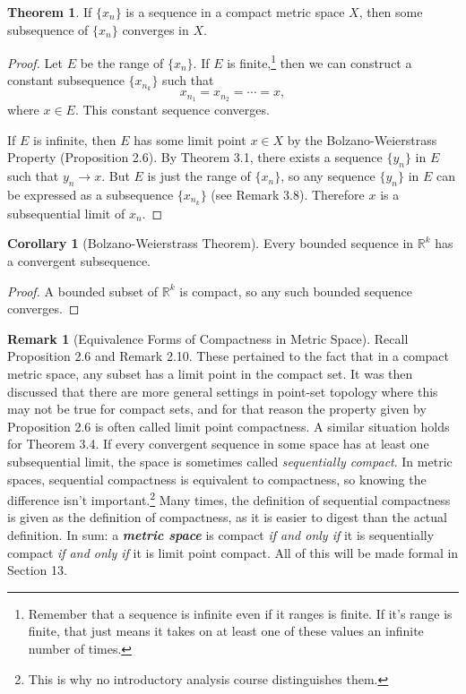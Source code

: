 \documentclass{article}
\newcommand{\R}{\mathbb{R}}
\theoremstyle{definition}
\newtheorem{theorem}{Theorem}[section]
\newtheorem{corollary}{Corollary}[section]
\newtheorem{remark}{Remark}[section]
\begin{document}
	\begin{theorem}
		If $ \{x_n\} $ is a sequence in a compact metric space $ X $, then some subsequence of $ \{x_n\} $ converges in $ X $. 
	\end{theorem}
	\begin{proof}
		Let $ E $ be the range of $ \{x_n\} $. If $ E $ is finite,\footnote{Remember that a sequence is infinite even if it ranges is finite. If it's range is finite, that just means it takes on at least one of these values an infinite number of times.} then we can construct a constant subsequence $ \{x_{n_k}\} $ such that $$x_{n_1}=x_{n_2}=\cdots= x ,$$ where $ x\in E $. This constant sequence converges.
		
		If $ E $ is infinite, then $ E $ has some limit point $ x\in X $ by the Bolzano-Weierstrass Property (Proposition 2.6). By Theorem 3.1, there exists a sequence $ \{y_n\} $ in $ E $ such that $ y_n\to x $. But $ E $ is just the range of $ \{x_n\} $, so any sequence $ \{y_n\} $ in $ E $ can be expressed as a subsequence $ \{x_{n_k}\} $ (see Remark 3.8). Therefore $ x $ is a subsequential limit of $ {x_n} $.  
	\end{proof}
	\begin{corollary}[Bolzano-Weierstrass Theorem]
		Every bounded sequence in $ \R^k $ has a convergent subsequence. 
	\end{corollary}
	\begin{proof}
		A bounded subset of $ \R^k $ is compact, so any such bounded sequence converges. 
	\end{proof}
	\begin{remark}[Equivalence Forms of Compactness in Metric Space]
		Recall Proposition 2.6 and Remark 2.10. These pertained to the fact that in a compact metric space, any subset has a limit point in the compact set. It was then discussed that there are more general settings in point-set topology where this may not be true for compact sets, and for that reason the property given by Proposition 2.6 is often called limit point compactness. A similar situation holds for Theorem 3.4. If every convergent sequence in some space has at least one subsequential limit, the space is sometimes called \textit{\color{red}sequentially compact}. In metric spaces, sequential compactness is equivalent to compactness, so knowing the difference isn't important.\footnote{This is why no introductory analysis course distinguishes them.} Many times, the definition of sequential compactness is given as the definition of compactness, as it is easier to digest than the actual definition. In sum: a \textit{\textbf{metric space}} is compact \textit{if and only if} it is sequentially compact \textit{if and only if} it is limit point compact. All of this will be made formal in Section 13.
	\end{remark}
\end{document}
